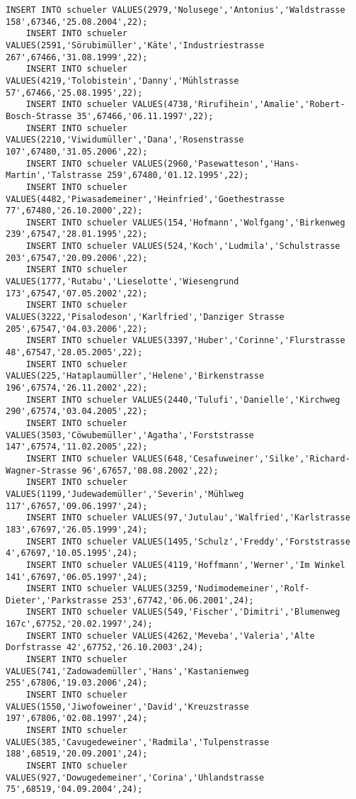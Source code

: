 \begin{lstlisting}[breaklines=True, numbers=none, basicstyle=\tiny, keepspaces=false]
	INSERT INTO schueler VALUES(2979,'Nolusege','Antonius','Waldstrasse 158',67346,'25.08.2004',22);
	INSERT INTO schueler VALUES(2591,'Sörubimüller','Käte','Industriestrasse 267',67466,'31.08.1999',22);
	INSERT INTO schueler VALUES(4219,'Tolobistein','Danny','Mühlstrasse 57',67466,'25.08.1995',22);
	INSERT INTO schueler VALUES(4738,'Rirufihein','Amalie','Robert-Bosch-Strasse 35',67466,'06.11.1997',22);
	INSERT INTO schueler VALUES(2210,'Viwidumüller','Dana','Rosenstrasse 107',67480,'31.05.2006',22);
	INSERT INTO schueler VALUES(2960,'Pasewatteson','Hans-Martin','Talstrasse 259',67480,'01.12.1995',22);
	INSERT INTO schueler VALUES(4482,'Piwasademeiner','Heinfried','Goethestrasse 77',67480,'26.10.2000',22);
	INSERT INTO schueler VALUES(154,'Hofmann','Wolfgang','Birkenweg 239',67547,'28.01.1995',22);
	INSERT INTO schueler VALUES(524,'Koch','Ludmila','Schulstrasse 203',67547,'20.09.2006',22);
	INSERT INTO schueler VALUES(1777,'Rutabu','Lieselotte','Wiesengrund 173',67547,'07.05.2002',22);
	INSERT INTO schueler VALUES(3222,'Pisalodeson','Karlfried','Danziger Strasse 205',67547,'04.03.2006',22);
	INSERT INTO schueler VALUES(3397,'Huber','Corinne','Flurstrasse 48',67547,'28.05.2005',22);
	INSERT INTO schueler VALUES(225,'Hataplaumüller','Helene','Birkenstrasse 196',67574,'26.11.2002',22);
	INSERT INTO schueler VALUES(2440,'Tulufi','Danielle','Kirchweg 290',67574,'03.04.2005',22);
	INSERT INTO schueler VALUES(3503,'Cöwubemüller','Agatha','Forststrasse 147',67574,'11.02.2005',22);
	INSERT INTO schueler VALUES(648,'Cesafuweiner','Silke','Richard-Wagner-Strasse 96',67657,'08.08.2002',22);
	INSERT INTO schueler VALUES(1199,'Judewademüller','Severin','Mühlweg 117',67657,'09.06.1997',24);
	INSERT INTO schueler VALUES(97,'Jutulau','Walfried','Karlstrasse 183',67697,'26.05.1999',24);
	INSERT INTO schueler VALUES(1495,'Schulz','Freddy','Forststrasse 4',67697,'10.05.1995',24);
	INSERT INTO schueler VALUES(4119,'Hoffmann','Werner','Im Winkel 141',67697,'06.05.1997',24);
	INSERT INTO schueler VALUES(3259,'Nudimodemeiner','Rolf-Dieter','Parkstrasse 253',67742,'06.06.2001',24);
	INSERT INTO schueler VALUES(549,'Fischer','Dimitri','Blumenweg 167c',67752,'20.02.1997',24);
	INSERT INTO schueler VALUES(4262,'Meveba','Valeria','Alte Dorfstrasse 42',67752,'26.10.2003',24);
	INSERT INTO schueler VALUES(741,'Zadowademüller','Hans','Kastanienweg 255',67806,'19.03.2006',24);
	INSERT INTO schueler VALUES(1550,'Jiwofoweiner','David','Kreuzstrasse 197',67806,'02.08.1997',24);
	INSERT INTO schueler VALUES(385,'Cavugedeweiner','Radmila','Tulpenstrasse 188',68519,'20.09.2001',24);
	INSERT INTO schueler VALUES(927,'Dowugedemeiner','Corina','Uhlandstrasse 75',68519,'04.09.2004',24);

\end{lstlisting}
